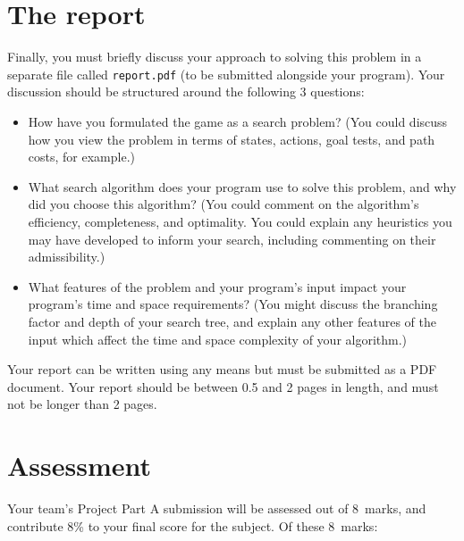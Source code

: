 \documentclass[]{article}
\begin{document}
\section*{The report}

Finally, you must briefly discuss your approach to solving this problem
in a separate file called \texttt{report.pdf} (to be submitted alongside
your program). Your discussion should be structured around the following
3 questions:

\begin{itemize}
\item
  How have you formulated the game as a search problem? (You could
  discuss how you view the problem in terms of states, actions, goal
  tests, and path costs, for example.)
\item
  What search algorithm does your program use to solve this problem, and
  why did you choose this algorithm? (You could comment on the
  algorithm's efficiency, completeness, and optimality. You could
  explain any heuristics you may have developed to inform your search,
  including commenting on their admissibility.)
\item
  What features of the problem and your program's input impact your
  program's time and space requirements? (You might discuss the
  branching factor and depth of your search tree, and explain any other
  features of the input which affect the time and space complexity of
  your algorithm.)
\end{itemize}

Your report can be written using any means but must be submitted as a
PDF document.
Your report should be between 0.5 and 2 pages in length, and must not
be longer than 2 pages.



\newpage

\section*{Assessment}

Your team's Project Part A submission will be assessed out of 8~marks,
and contribute 8\% to your final score for the subject.
Of these 8~marks:
\end{document}
